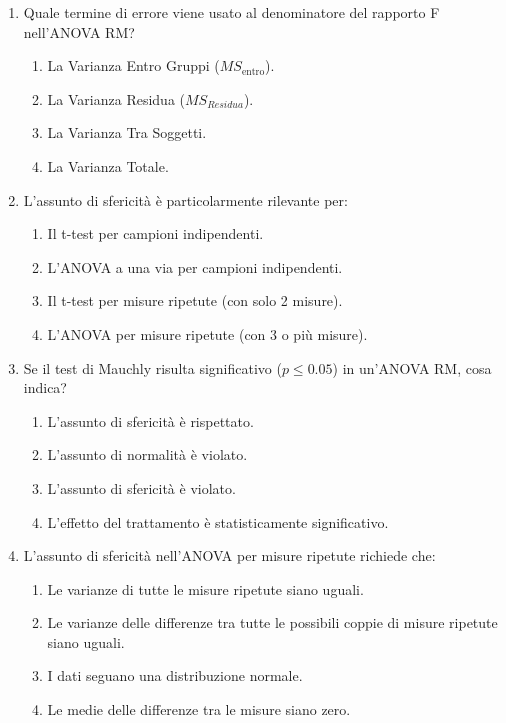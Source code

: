 \documentclass[12pt, a4paper]{article}
\newcommand{\MSw}{MS_{\text{entro}}} %
\begin{document}
\begin{enumerate}
     \item Quale termine di errore viene usato al denominatore del rapporto F nell'ANOVA RM?
    \begin{enumerate}
        \item La Varianza Entro Gruppi ($\MSw$).
        \item La Varianza Residua ($MS_{Residua}$).
        \item La Varianza Tra Soggetti.
        \item La Varianza Totale.
    \end{enumerate}

     \item L'assunto di sfericità è particolarmente rilevante per:
    \begin{enumerate}
        \item Il t-test per campioni indipendenti.
        \item L'ANOVA a una via per campioni indipendenti.
        \item Il t-test per misure ripetute (con solo 2 misure).
        \item L'ANOVA per misure ripetute (con 3 o più misure).
    \end{enumerate}

     \item Se il test di Mauchly risulta significativo ($p \le 0.05$) in un'ANOVA RM, cosa indica?
    \begin{enumerate}
        \item L'assunto di sfericità è rispettato.
        \item L'assunto di normalità è violato.
        \item L'assunto di sfericità è violato.
        \item L'effetto del trattamento è statisticamente significativo.
    \end{enumerate}

    \item L'assunto di sfericità nell'ANOVA per misure ripetute richiede che:
    \begin{enumerate}
      \item Le varianze di tutte le misure ripetute siano uguali.
      \item Le varianze delle differenze tra tutte le possibili coppie di misure ripetute siano uguali.
      \item I dati seguano una distribuzione normale.
      \item Le medie delle differenze tra le misure siano zero.
    \end{enumerate}


\end{enumerate}
\end{document}

